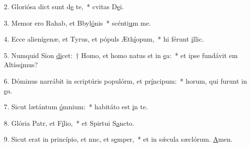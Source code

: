 2. Gloriósa dict sunt d\uline{e} te,~* cvitas D\uline{e}i.\par 
3. Memor ero Rahab, et Bbyl\uline{ó}nis~* scénti\uline{u}m me.\par 
4. Ecce alienígenæ, et Tyrus, et pópuls Æth\uline{í}opum,~* hi férunt \uline{i}llic.\par 
5. Numquid Sion \uline{di}cet:~† Homo, et homo natus st in \uline{e}a:~* et ipse fundávit em Altíss\uline{i}mus?\par 
6. Dóminus narrábit in scriptúris populórm, et pr\uline{í}ncipum:~* horum, qui furunt in \uline{e}a.\par 
7. Sicut lætántum \uline{ó}mnium:~* habitáto est \uline{i}n te.\par 
8. Glória Patr, et F\uline{í}lio,~* et Spirtui S\uline{a}ncto.\par 
9. Sicut erat in princípio, et nnc, et s\uline{e}mper,~* et in sǽcula sæclórum. \uline{A}men.\par 
